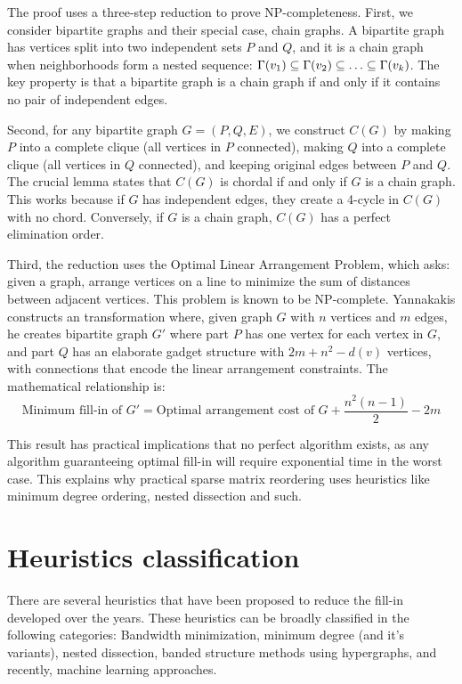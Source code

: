 The proof uses a three-step reduction to prove NP-completeness. First, we consider bipartite graphs and their special case, chain graphs. A bipartite graph has vertices split into two independent sets $P$ and $Q$, and it is a chain graph when neighborhoods form a nested sequence: $\Gamma(v\sb{1}) \subseteq \Gamma(v\sb{2}) \subseteq \ldots \subseteq \Gamma(v\sb{k})$. The key property is that a bipartite graph is a chain graph if and only if it contains no pair of independent edges.

Second, for any bipartite graph $G = (P, Q, E)$, we construct $C(G)$ by making $P$ into a complete clique (all vertices in $P$ connected), making $Q$ into a complete clique (all vertices in $Q$ connected), and keeping original edges between $P$ and $Q$. The crucial lemma states that $C(G)$ is chordal if and only if $G$ is a chain graph. This works because if $G$ has independent edges, they create a 4-cycle in $C(G)$ with no chord. Conversely, if $G$ is a chain graph, $C(G)$ has a perfect elimination order.

Third, the reduction uses the Optimal Linear Arrangement Problem, which asks: given a graph, arrange vertices on a line to minimize the sum of distances between adjacent vertices. This problem is known to be NP-complete. Yannakakis constructs an transformation where, given graph $G$ with $n$ vertices and $m$ edges, he creates bipartite graph $G'$ where part $P$ has one vertex for each vertex in $G$, and part $Q$ has an elaborate gadget structure with $2m + n^2 - d(v)$ vertices, with connections that encode the linear arrangement constraints. The mathematical relationship is:
\begin{equation}
\text{Minimum fill-in of } G' = \text{Optimal arrangement cost of } G + \frac{n^2(n-1)}{2} - 2m
\end{equation}

This result has practical implications that no perfect algorithm exists, as any algorithm guaranteeing optimal fill-in will require exponential time in the worst case. This explains why practical sparse matrix reordering uses heuristics like minimum degree ordering, nested dissection and such.

\section{Heuristics classification}
\label{sec:heuristics}

There are several heuristics that have been proposed to reduce the fill-in developed over the years. These heuristics can be broadly classified in the following categories: Bandwidth minimization, minimum degree (and it's variants), nested dissection, banded structure methods using hypergraphs, and recently, machine learning approaches. 

